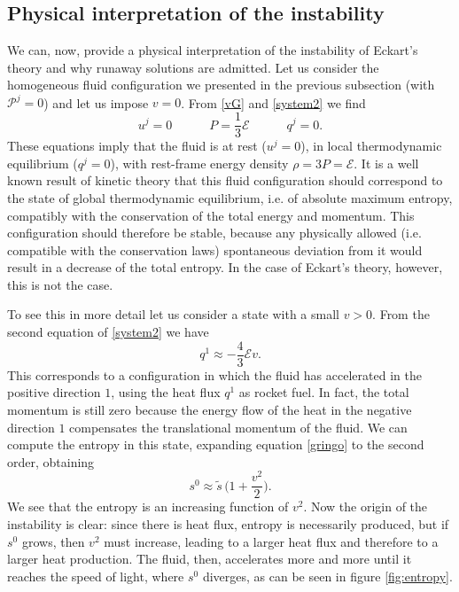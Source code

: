 \documentclass[a4paper, amsfonts, amssymb, amsmath, reprint, showkeys, nofootinbib, twoside]{revtex4-1}
\newcommand{\spc}{\quad \quad \quad}
\begin{document}
\subsection{Physical interpretation of the instability}

We can, now, provide a physical interpretation of the instability of Eckart's theory and why runaway solutions are admitted. Let us consider the homogeneous fluid configuration we presented in the previous subsection (with $\mathcal{P}^j=0$) and let us impose $v=0$. From \eqref{vG} and \eqref{system2} we find
\begin{equation}\label{equillll}
u^j =0  \spc P = \dfrac{1}{3} \mathcal{E}  \spc  q^j =0.
\end{equation}
These equations imply that the fluid is at rest ($u^j=0$), in local thermodynamic equilibrium ($q^j=0$), with rest-frame energy density $\rho = 3P = \mathcal{E}$. It is a well known result of kinetic theory \citep{cercignani_book} that this fluid configuration should correspond to the state of global thermodynamic equilibrium, i.e. of absolute maximum entropy, compatibly with the conservation of the total energy and momentum. This configuration should therefore be stable, because any physically allowed (i.e. compatible with the conservation laws) spontaneous deviation from it would result in a decrease of the total entropy. In the case of Eckart's theory, however, this is not the case.

To see this in more detail let us consider a state with a small $v>0$. From the second equation of \eqref{system2} we have
\begin{equation}\label{sbup}
q^1 \approx -\dfrac{4}{3} \mathcal{E} v.
\end{equation}
This corresponds to a configuration in which the fluid has accelerated in the positive direction $1$, using the heat flux $q^1$ as rocket fuel. In fact, the total momentum is still zero because the energy flow of the heat in the negative direction $1$ compensates the translational momentum of the fluid. We can compute the entropy in this state, expanding equation \eqref{gringo} to the second order, obtaining
\begin{equation}\label{S0}
s^0 \approx \tilde{s} \, \bigg( 1+ \dfrac{v^2}{2} \bigg).
\end{equation}
We see that the entropy is an increasing function of $v^2$. Now the origin of the instability is clear: since there is heat flux, entropy is necessarily produced, but if $s^0$ grows, then $v^2$ must increase, leading to a larger heat flux and therefore to a larger heat production. The fluid, then, accelerates more and more until it reaches the speed of light, where $s^0$ diverges, as can be seen in figure \ref{fig:entropy}. 
\end{document}
